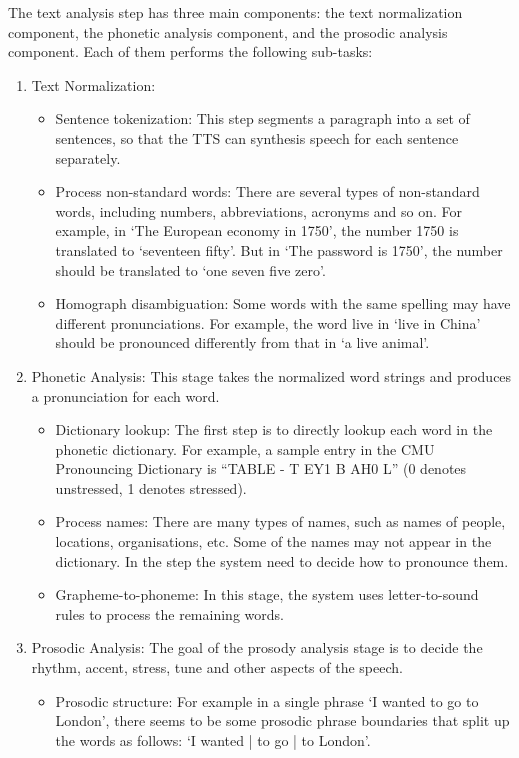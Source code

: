 The text analysis step has three main components: the text normalization component, the phonetic analysis component, and the prosodic analysis component. Each of them performs the following sub-tasks:
\begin{enumerate}
\item{Text Normalization:
    \begin{itemize}
    \item Sentence tokenization: This step segments a paragraph into a set of sentences, so that the TTS can synthesis speech for each sentence separately.
    \item Process non-standard words: There are several types of non-standard words, including numbers, abbreviations, acronyms and so on. For example, in `The European economy in 1750', the number 1750 is translated to `seventeen fifty'. But in `The password is 1750', the number should be translated to `one seven five zero'.
    \item Homograph disambiguation: Some words with the same spelling may have different pronunciations. For example, the word live in `live in China' should be pronounced differently from that in `a live animal'.
    \end{itemize}
}
\item{Phonetic Analysis: This stage takes the normalized word strings and produces a pronunciation for each word.
    \begin{itemize}
    \item Dictionary lookup: The first step is to directly lookup each word in the phonetic dictionary. For example, a sample entry in the CMU Pronouncing Dictionary is ``TABLE - T EY1 B AH0 L'' (0 denotes unstressed, 1 denotes stressed).
    \item Process names: There are many types of names, such as names of people, locations, organisations, etc. Some of the names may not appear in the dictionary. In the step the system need to decide how to pronounce them.
    \item Grapheme-to-phoneme: In this stage, the system uses letter-to-sound rules to process the remaining words.
    \end{itemize}
}
\item{Prosodic Analysis: The goal of the prosody analysis stage is to decide the rhythm, accent, stress, tune and other aspects of the speech.
    \begin{itemize}
    \item Prosodic structure: For example in a single phrase `I wanted to go to London', there seems to be some prosodic phrase boundaries that split up the words as follows: `I wanted | to go | to London'.

\end{itemize}}
\end{enumerate}
